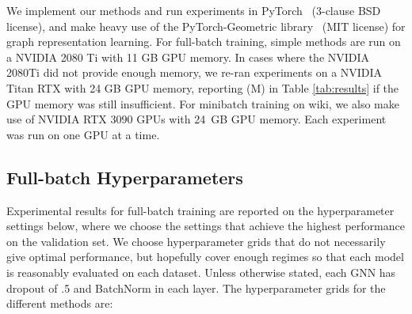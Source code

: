 \documentclass{article}
\begin{document}
We implement our methods and run experiments in PyTorch~\cite{paszke2019pytorch} (3-clause BSD license), and make heavy use of the PyTorch-Geometric library~\cite{fey2019fast} (MIT license) for graph representation learning. For full-batch training, simple methods are run on a NVIDIA 2080 Ti with 11 GB GPU memory. In cases where the NVIDIA 2080Ti did not provide enough memory, we re-ran experiments on a NVIDIA Titan RTX with 24 GB GPU memory, reporting (M) in Table \ref{tab:results} if the GPU memory was still insufficient. For minibatch training on wiki, we also make use of NVIDIA RTX 3090 GPUs with 24~GB GPU memory. Each experiment was run on one GPU at a time.
 
\subsection{Full-batch Hyperparameters}\label{sec:hparams}

Experimental results for full-batch training are reported on the hyperparameter settings below, where we choose the settings that achieve the highest performance on the validation set.
We choose hyperparameter grids that do not necessarily give optimal performance, but hopefully cover enough regimes so that each model is reasonably evaluated on each dataset. Unless otherwise stated, each GNN has dropout of .5 \cite{srivastava2014dropout} and BatchNorm \cite{ioffe2015batch} in each layer. The hyperparameter grids for the different methods are:
\end{document}
